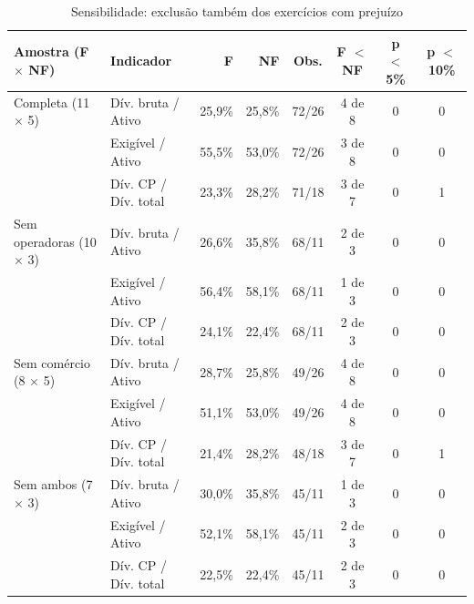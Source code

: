 \begin{table}[htb]
\caption{Sensibilidade: exclusão também dos exercícios com prejuízo}\label{tab:banca-prejuizo}
\centering\footnotesize\setlength{\tabcolsep}{4pt}
\begin{tabular}{llrrcccc}
\toprule
Amostra (F $\times$ NF) & Indicador & F & NF & Obs. & F $<$ NF & p $<$ 5\% & p $<$ 10\% \\
\midrule
Completa (11 $\times$ 5) & Dív. bruta / Ativo & 25,9\% & 25,8\% & 72/26 & 4 de 8 & 0 & 0 \\
 & Exigível / Ativo & 55,5\% & 53,0\% & 72/26 & 3 de 8 & 0 & 0 \\
 & Dív. CP / Dív. total & 23,3\% & 28,2\% & 71/18 & 3 de 7 & 0 & 1 \\
Sem operadoras (10 $\times$ 3) & Dív. bruta / Ativo & 26,6\% & 35,8\% & 68/11 & 2 de 3 & 0 & 0 \\
 & Exigível / Ativo & 56,4\% & 58,1\% & 68/11 & 1 de 3 & 0 & 0 \\
 & Dív. CP / Dív. total & 24,1\% & 22,4\% & 68/11 & 2 de 3 & 0 & 0 \\
Sem comércio (8 $\times$ 5) & Dív. bruta / Ativo & 28,7\% & 25,8\% & 49/26 & 4 de 8 & 0 & 0 \\
 & Exigível / Ativo & 51,1\% & 53,0\% & 49/26 & 4 de 8 & 0 & 0 \\
 & Dív. CP / Dív. total & 21,4\% & 28,2\% & 48/18 & 3 de 7 & 0 & 1 \\
Sem ambos (7 $\times$ 3) & Dív. bruta / Ativo & 30,0\% & 35,8\% & 45/11 & 1 de 3 & 0 & 0 \\
 & Exigível / Ativo & 52,1\% & 58,1\% & 45/11 & 2 de 3 & 0 & 0 \\
 & Dív. CP / Dív. total & 22,5\% & 22,4\% & 45/11 & 2 de 3 & 0 & 0 \\
\bottomrule
\end{tabular}
\end{table}
